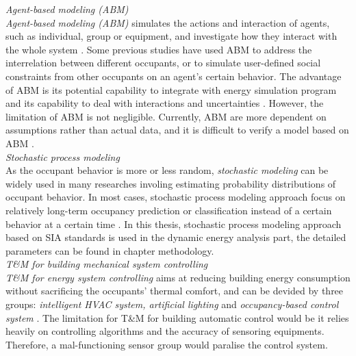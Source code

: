 \documentclass[11pt, a4paper]{article}
\theoremstyle{definition}
\begin{document}
				\textit{Agent-based modeling (ABM)}\\
				\textit{Agent-based modeling (ABM)} simulates the actions and interaction of agents, such as individual, group or equipment, and investigate how they interact with the whole system \cite{jia2017occupancy}. Some previous studies have used ABM to address the interrelation between different occupants, or to simulate user-defined social constraints from other occupants on an agent's certain behavior. The advantage of ABM is its potential capability to integrate with energy simulation program and its capability to deal with interactions and uncertainties \cite{ZOU2018165}. However, the limitation of ABM is not negligible. Currently, ABM are more dependent on assumptions rather than actual data, and it is difficult to verify a model based on ABM \cite{ZOU2018165,jia2017occupancy}. \\


				\textit{Stochastic process modeling}\\
					As the occupant behavior is more or less random, \textit{stochastic modeling} can be widely used in many researches involing estimating probability distributions of occupant behavior. In most cases, stochastic process modeling approach focus on relatively long-term occupancy prediction or classification instead of a certain behavior at a certain time \cite{ZOU2018165}.
					In this thesis, stochastic process modeling approach based on SIA standards is used in the dynamic energy analysis part, the detailed parameters can be found in chapter methodology.\\


			\textit{T\&M for building mechanical system controlling}\\

				\textit{T\&M for energy system controlling} aims at reducing building energy consumption without sacrificing the occupants' thermal comfort, and can be devided by three groups: \textit{intelligent HVAC system, artificial lighting} and \textit{occupancy-based control system} \cite{ZOU2018165,hong2015review}. The limitation for T\&M for building automatic control would be it relies heavily on controlling algorithms and the accuracy of sensoring equipments. Therefore, a mal-functioning sensor group would paralise the control system.
\end{document}
